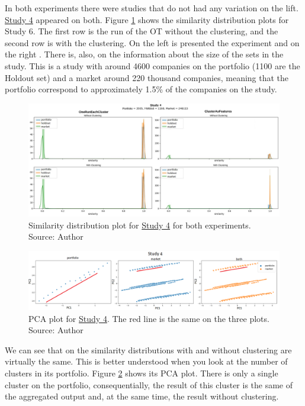 In both experiments there were studies that do not had any variation on the lift. \underline{Study 4} appeared on both. Figure \ref{fig:study-4-comparsion} shows the similarity distribution plots for Study 6. The first row is the run of the OT without the clustering, and the second row is with the clustering. On the left is presented the \nameExperimentI{} experiment and on the right \nameExperimentII{}. There is, also, on the information about the size of the sets in the study. This is a study with around 4600 companies on the portfolio (1100 are the Holdout set) and a market around 220 thousand companies, meaning that the portfolio correspond to approximately 1.5\% of the companies on the study.

\begin{figure}[h]
   \centering
   \includegraphics[width=\linewidth]{fig/ch4-study-4-comparsion.jpg}
   \caption{Similarity distribution plot for \underline{Study 4} for both experiments. Source: Author}
   \label{fig:study-4-comparsion}
\end{figure}

\begin{figure}[h]
   \centering
   \includegraphics[width=\linewidth]{fig/ch4-study-4-pca-plot.png}
   \caption{PCA plot for \underline{Study 4}. The red line is the same on the three plots. Source: Author}
   \label{fig:study-4-pca-plot}
\end{figure}

We can see that on \nameExperimentI{} the similarity distributions with and without clustering are virtually the same. This is better understood when you look at the number of clusters in its portfolio. Figure \ref{fig:study-4-pca-plot} shows its PCA plot. There is only a single cluster on the portfolio, consequentially, the result of this cluster is the same of the aggregated output and, at the same time, the result without clustering.

